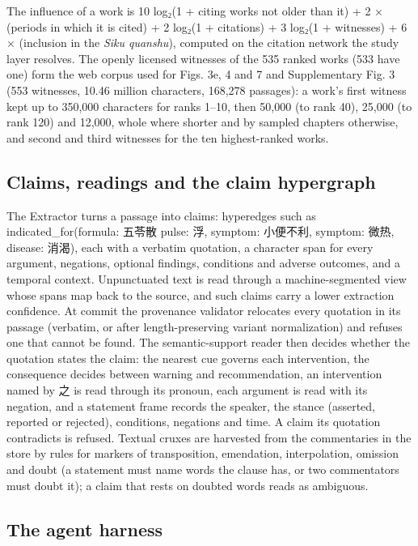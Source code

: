 \documentclass[
]{article}
\begin{document}
The influence of a work is 10 log₂(1 + citing works not older than it) +
2 × (periods in which it is cited) + 2 log₂(1 + citations) + 3 log₂(1 +
witnesses) + 6 × (inclusion in the \emph{Siku quanshu}), computed on the
citation network the study layer resolves. The openly licensed witnesses
of the 535 ranked works (533 have one) form the web corpus used for
Figs. 3e, 4 and 7 and Supplementary Fig. 3 (553 witnesses, 10.46 million
characters, 168,278 passages): a work's first witness kept up to 350,000
characters for ranks 1--10, then 50,000 (to rank 40), 25,000 (to rank
120) and 12,000, whole where shorter and by sampled chapters otherwise,
and second and third witnesses for the ten highest-ranked works.

\hypertarget{claims-readings-and-the-claim-hypergraph}{%
\subsection{Claims, readings and the claim
hypergraph}\label{claims-readings-and-the-claim-hypergraph}}

The Extractor turns a passage into claims: hyperedges such as
indicated\_for(formula: 五苓散 \textbar{} pulse: 浮, symptom: 小便不利,
symptom: 微热, disease: 消渴), each with a verbatim quotation, a
character span for every argument, negations, optional findings,
conditions and adverse outcomes, and a temporal context. Unpunctuated
text is read through a machine-segmented view whose spans map back to
the source, and such claims carry a lower extraction confidence. At
commit the provenance validator relocates every quotation in its passage
(verbatim, or after length-preserving variant normalization) and refuses
one that cannot be found. The semantic-support reader then decides
whether the quotation states the claim: the nearest cue governs each
intervention, the consequence decides between warning and
recommendation, an intervention named by 之 is read through its pronoun,
each argument is read with its negation, and a statement frame records
the speaker, the stance (asserted, reported or rejected), conditions,
negations and time. A claim its quotation contradicts is refused.
Textual cruxes are harvested from the commentaries in the store by rules
for markers of transposition, emendation, interpolation, omission and
doubt (a statement must name words the clause has, or two commentators
must doubt it); a claim that rests on doubted words reads as ambiguous.

\hypertarget{the-agent-harness}{%
\subsection{The agent harness}\label{the-agent-harness}}
\end{document}
